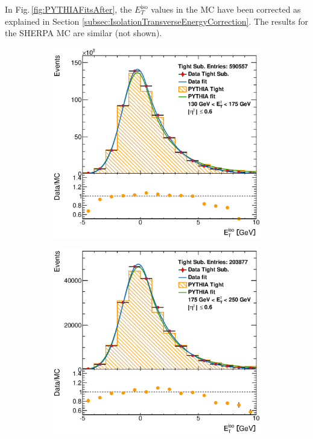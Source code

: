 \documentclass[12pt, twoside]{article}
\numberwithin{equation}{section}
\numberwithin{figure}{section}
\newenvironment{changemargin}[2]{%
\begin{list}{}{%
\setlength{\topsep}{0pt}%
\setlength{\leftmargin}{#1}%
\setlength{\rightmargin}{#2}%
\setlength{\listparindent}{\parindent}%
\setlength{\itemindent}{\parindent}%
\setlength{\parsep}{\parskip}%
}%
\item[]}{\end{list}}
\begin{document}
In Fig.\,\ref{fig:PYTHIAFitsAfter}, the $E^{\text{iso}}_{T}$ values in the MC have been corrected as explained in Section \ref{subsec:IsolationTransverseEnergyCorrection}. The results for the SHERPA MC are similar (not shown).
\begin{figure}[H]
    \vspace{3.4cm}
    \checkoddpage
    \ifoddpage
        \begin{changemargin}{-1.0cm}{-0.75cm}
    \else
        \begin{changemargin}{-0.75cm}{-1.0cm}
    \fi
    \centering
        \begin{subfigure}[b]{0.27\textwidth}
            \includegraphics[width=\textwidth]{./images/EtISOCorrection/T_MC_FITS-11(10GeV)(After).eps}
        \end{subfigure}
        \begin{subfigure}[b]{0.27\textwidth}
            \includegraphics[width=\textwidth]{./images/EtISOCorrection/T_MC_FITS-12(10GeV)(After).eps}

\end{subfigure}
\end{changemargin}
\end{changemargin}
\end{figure}
\end{document}
